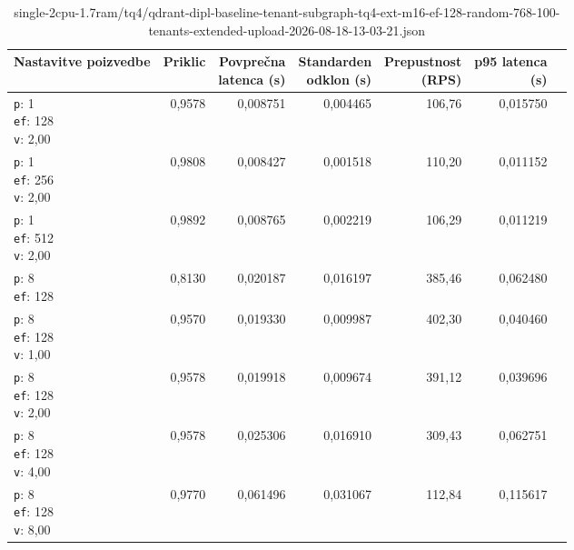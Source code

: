 \begin{table}[htbp]
  \centering
\small
  \caption{single-2cpu-1.7ram/tq4/qdrant-dipl-baseline-tenant-subgraph-tq4-ext-m16-ef-128-random-768-100-tenants-extended-upload-2026-08-18-13-03-21.json}
  \label{tab:single-2cpu-1.7ram:tq4:qdrant-dipl-baseline-tenant-subgraph-tq4-ext-m16-ef-128-random-768-100-tenants-extended-upload-2026-08-18-13-03-21.json}
  \begin{tabularx}{\textwidth}{Xrrrrrr}
    \toprule
    Nastavitve poizvedbe & Priklic & \makecell{Povprečna\\latenca (s)} & \makecell{Standarden\\odklon (s)} & \makecell{Prepustnost\\(RPS)} & \makecell{p95 latenca\\(s)}  \\
    \midrule
    \makecell{\texttt{p}: 1\\\texttt{ef}: 128\\\texttt{v}: 2,00} & 0,9578 & 0,008751 & 0,004465 & 106,76 & 0,015750 \\
    \makecell{\texttt{p}: 1\\\texttt{ef}: 256\\\texttt{v}: 2,00} & 0,9808 & 0,008427 & 0,001518 & 110,20 & 0,011152 \\
    \makecell{\texttt{p}: 1\\\texttt{ef}: 512\\\texttt{v}: 2,00} & 0,9892 & 0,008765 & 0,002219 & 106,29 & 0,011219 \\
    \makecell{\texttt{p}: 8\\\texttt{ef}: 128} & 0,8130 & 0,020187 & 0,016197 & 385,46 & 0,062480 \\
    \makecell{\texttt{p}: 8\\\texttt{ef}: 128\\\texttt{v}: 1,00} & 0,9570 & 0,019330 & 0,009987 & 402,30 & 0,040460 \\
    \makecell{\texttt{p}: 8\\\texttt{ef}: 128\\\texttt{v}: 2,00} & 0,9578 & 0,019918 & 0,009674 & 391,12 & 0,039696 \\
    \makecell{\texttt{p}: 8\\\texttt{ef}: 128\\\texttt{v}: 4,00} & 0,9578 & 0,025306 & 0,016910 & 309,43 & 0,062751 \\
    \makecell{\texttt{p}: 8\\\texttt{ef}: 128\\\texttt{v}: 8,00} & 0,9770 & 0,061496 & 0,031067 & 112,84 & 0,115617 \\

\end{tabularx}
\end{table}
